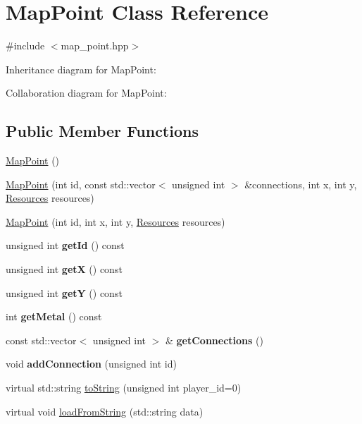 \hypertarget{classMapPoint}{}\section{Map\+Point Class Reference}
\label{classMapPoint}


{\ttfamily \#include $<$map\+\_\+point.\+hpp$>$}



Inheritance diagram for Map\+Point\+:


Collaboration diagram for Map\+Point\+:
\subsection*{Public Member Functions}
\begin{DoxyCompactItemize}
\item 
\hyperlink{classMapPoint_ab74cdf0388b2b7a08763e06006ddfeb9}{Map\+Point} ()
\item 
\hyperlink{classMapPoint_a2b7ec1372a03f899cbaa771d8acb9031}{Map\+Point} (int id, const std\+::vector$<$ unsigned int $>$ \&connections, int x, int y, \hyperlink{classResources}{Resources} resources)
\item 
\hyperlink{classMapPoint_a3d9f8e84d581d1f2a99e6868bd7b4fad}{Map\+Point} (int id, int x, int y, \hyperlink{classResources}{Resources} resources)
\item 
unsigned int {\bfseries get\+Id} () const \hypertarget{classMapPoint_a07b1029f4d2d640a323bc01c95f1963a}{}\label{classMapPoint_a07b1029f4d2d640a323bc01c95f1963a}

\item 
unsigned int {\bfseries getX} () const \hypertarget{classMapPoint_a72e5351f3e9606dacb7c513b7d8c4196}{}\label{classMapPoint_a72e5351f3e9606dacb7c513b7d8c4196}

\item 
unsigned int {\bfseries getY} () const \hypertarget{classMapPoint_aad906af349564b21bdea9ab91a27fb6a}{}\label{classMapPoint_aad906af349564b21bdea9ab91a27fb6a}

\item 
int {\bfseries get\+Metal} () const \hypertarget{classMapPoint_ad17d07c7d1c6821a8ea4829202631fcb}{}\label{classMapPoint_ad17d07c7d1c6821a8ea4829202631fcb}

\item 
const std\+::vector$<$ unsigned int $>$ \& {\bfseries get\+Connections} ()\hypertarget{classMapPoint_ae22a25f9ab9c4c277ab036fd2c76d53d}{}\label{classMapPoint_ae22a25f9ab9c4c277ab036fd2c76d53d}

\item 
void {\bfseries add\+Connection} (unsigned int id)\hypertarget{classMapPoint_abe57aef2138a8ea9a184fb200246702a}{}\label{classMapPoint_abe57aef2138a8ea9a184fb200246702a}

\item 
virtual std\+::string \hyperlink{classMapPoint_a45aa1bd9ce0a2d172c135f324f823973}{to\+String} (unsigned int player\+\_\+id=0)
\item 
virtual void \hyperlink{classMapPoint_add482d105e9b5089fb274dd1f32dfa9d}{load\+From\+String} (std\+::string data)
\end{DoxyCompactItemize}

